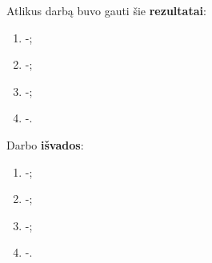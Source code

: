 \documentclass{VUMIFPSbakalaurinis}
\begin{document}







Atlikus darbą buvo gauti šie \textbf{rezultatai}:
\begin{enumerate}
    \item -;
    \item -;
    \item -;
    \item -.
\end{enumerate}

Darbo \textbf{išvados}:
\begin{enumerate}
    \item -;
    \item -;
    \item -;
    \item -.
\end{enumerate}

\printbibliography[heading=bibintoc]  %
\end{document}

